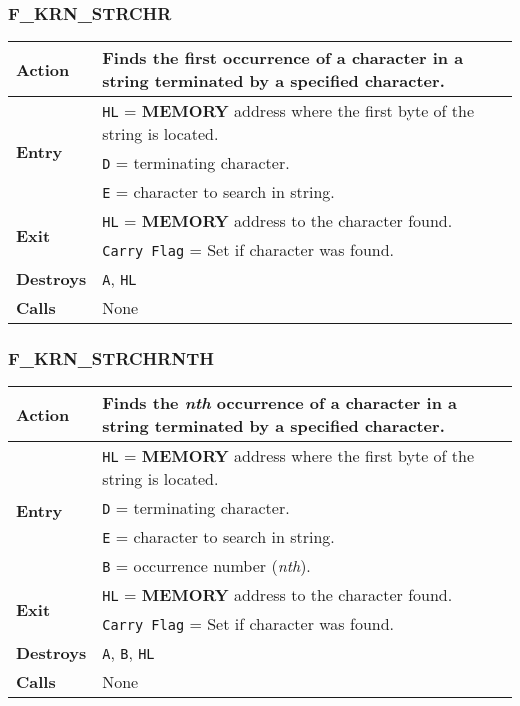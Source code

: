     \subsubsection{F\_KRN\_STRCHR}
    \label{func:fkrnstrchr}
    \begin{tabular}{l p{15cm}}
        \hline\textbf{Action}
        & Finds the first occurrence of a character in a string terminated by a
            specified character.\\
        \hline\multirow[t]{3}{4em}{\textbf{Entry}}
        & \texttt{HL} = \textbf{MEMORY} address where the first byte of the
        string is located.\\
        & \texttt{D} = terminating character.\\
        & \texttt{E} = character to search in string.\\
        \hline\multirow[t]{2}{4em}{\textbf{Exit}}
        & \texttt{HL} = \textbf{MEMORY} address to the character found.\\
        & \texttt{Carry Flag} = Set if character was found.\\
        \hline\textbf{Destroys} & \texttt{A}, \texttt{HL}\\
        \hline\textbf{Calls} & None\\
        \hline
    \end{tabular}

    \subsubsection{F\_KRN\_STRCHRNTH}
    \label{func:fkrnstrchr}
    \begin{tabular}{l p{15cm}}
        \hline\textbf{Action}
        & Finds the \textit{nth} occurrence of a character in a string terminated by a
            specified character.\\
        \hline\multirow[t]{4}{4em}{\textbf{Entry}}
        & \texttt{HL} = \textbf{MEMORY} address where the first byte of the
        string is located.\\
        & \texttt{D} = terminating character.\\
        & \texttt{E} = character to search in string.\\
        & \texttt{B} = occurrence number (\textit{nth}).\\
        \hline\multirow[t]{2}{4em}{\textbf{Exit}}
        & \texttt{HL} = \textbf{MEMORY} address to the character found.\\
        & \texttt{Carry Flag} = Set if character was found.\\
        \hline\textbf{Destroys} & \texttt{A}, \texttt{B}, \texttt{HL}\\
        \hline\textbf{Calls} & None\\
        \hline
    \end{tabular}